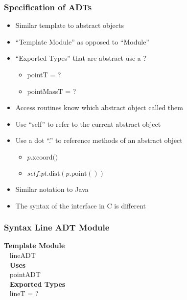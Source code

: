 \documentclass[t,12pt,numbers,fleqn]{beamer}
\begin{document}
\begin{frame}
\frametitle{Specification of ADTs}
\begin{itemize}
\item Similar template to abstract objects
\item ``Template Module'' as opposed to ``Module''
\item ``Exported Types'' that are abstract use a ?
\begin{itemize}
\item pointT = ?
\item pointMassT = ?
\end{itemize}
\item Access routines know which abstract object called them
\item Use ``self'' to refer to the current abstract object
\item Use a dot ``.'' to reference methods of an abstract object
\begin{itemize}
\item $p.\mbox{xcoord()}$
\item $\mathit{self}.pt.\mbox{dist}(p.\mbox{point}())$
\end{itemize}
\item Similar notation to Java
\item The syntax of the interface in C is different
\end{itemize}
\end{frame}


\begin{frame}
\frametitle{Syntax Line ADT Module}

\textbf{Template Module}\\
~\newline
lineADT\\
~\newline
\textbf{Uses}\\
~\newline
pointADT\\
~\newline
\textbf{Exported Types}\\
~\newline
lineT = ?

\end{frame}

\end{document}
